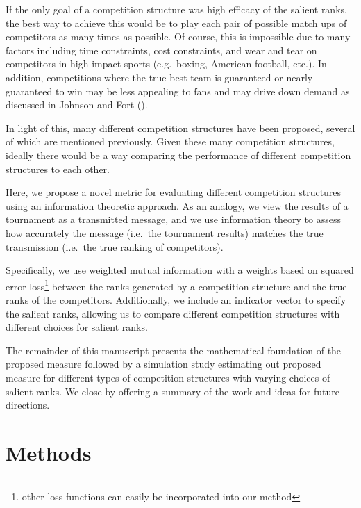 \documentclass[
  12pt,
]{article}
\begin{document}
If the only goal of a competition structure was high efficacy of the
salient ranks, the best way to achieve this would be to play each pair
of possible match ups of competitors as many times as possible. Of
course, this is impossible due to many factors including time
constraints, cost constraints, and wear and tear on competitors in high
impact sports (e.g.~boxing, American football, etc.). In addition,
competitions where the true best team is guaranteed or nearly guaranteed
to win may be less appealing to fans and may drive down demand as
discussed in Johnson and Fort ().

In light of this, many different competition structures have been
proposed, several of which are mentioned previously. Given these many
competition structures, ideally there would be a way comparing the
performance of different competition structures to each other.

Here, we propose a novel metric for evaluating different competition
structures using an information theoretic approach. As an analogy, we
view the results of a tournament as a transmitted message, and we use
information theory to assess how accurately the message (i.e.~the
tournament results) matches the true transmission (i.e.~the true ranking
of competitors).

Specifically, we use weighted mutual information with a weights based on
squared error loss\footnote{other loss functions can easily be
  incorporated into our method} between the ranks generated by a
competition structure and the true ranks of the competitors.
Additionally, we include an indicator vector to specify the salient
ranks, allowing us to compare different competition structures with
different choices for salient ranks.

The remainder of this manuscript presents the mathematical foundation of
the proposed measure followed by a simulation study estimating out
proposed measure for different types of competition structures with
varying choices of salient ranks. We close by offering a summary of the
work and ideas for future directions.

\section{Methods}\label{methods}
\end{document}
